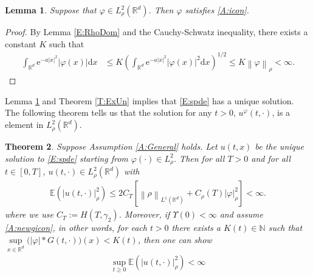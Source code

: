 \documentclass[a4paper,11pt]{article}%
\numberwithin{equation}{section}
\theoremstyle{plain}
\newtheorem{theorem}{Theorem}[section]
\newtheorem{lemma}[theorem]{Lemma}
\theoremstyle{definition}
\newcommand{\R}{\mathbb{R}}
\newcommand{\E}{\mathbb{E}}
\newcommand{\e}{\mathrm{e}}
\newcommand{\Norm}[1]{\left\|  #1   \right\|}
\newcommand{\ud}{\ensuremath{ \mathrm{d} }}
\begin{document}
\begin{lemma}
	\label{L:phi}
	Suppose that $\varphi \in L^2_\rho(\R^d)$. Then $\varphi$ satisfies \eqref{A:icon}.
\end{lemma}

\begin{proof}
By Lemma \ref{E:RhoDom} and the Cauchy-Schwatz inequality, there exists a constant $K$ such that
	\begin{align*}
	\int_{\R^d} \e^{-a|x|^2} |\varphi(x)|\ud x
	&\le K\left(\int_{\R^d} \e^{-a|x|^2} |\varphi(x)|^2\ud x\right)^{1/2}
	\le K \Norm{\varphi}_\rho<\infty.
	\end{align*}
\end{proof}

Lemma \ref{L:phi} and Theorem \ref{T:ExUn} implies that \eqref{E:spde} has a unique solution.
The following theorem tells us that the solution for any $t>0$, $u^{\varphi}(t,\cdot)$, is a element in $L_\rho^2(\R^d)$.

\begin{theorem}
	\label{T:Moment}
	Suppose Assumption \ref{A:General} holds.
	Let $u(t,x)$ be the unique solution to \eqref{E:spde} starting from  $\varphi(\cdot) \in L^2_\rho$.
	Then for all $T>0$ and for all $t \in [0,T]$, $u(t,\cdot)\in L^2_\rho(\R^d)$ with
	\begin{align}
	\label{E:uNormRho}
	\E\left(| u(t,\cdot)|_\rho^2\right)
	\le  2 C_T \left[ \Norm{\rho}_{L^1(\R^d)} + C_\rho(T) |\varphi|_{\rho}^2 \right]<\infty.
	\end{align}
	where we use $C_T:= H(T,\gamma_2)$. Moreover, if $\Upsilon(0)<\infty$ and assume \eqref{A:newgicon}, in other words, for each $t>0$ there exists a $K(t) \in \mathbb N$ such that $\sup\limits_{x\in \R^d}\big(|\varphi|*G(t,\cdot)\big)(x) < K(t)$, then one can show
	\begin{align*}
	\sup_{t\ge 0}\E\left(|u(t,\cdot)|_\rho^2\right) < \infty
	\end{align*}
\end{theorem}
\end{document}
